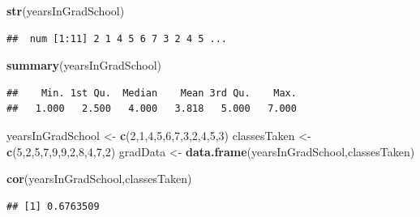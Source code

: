 \documentclass[]{book}
\newenvironment{Shaded}{\begin{snugshade}}{\end{snugshade}}
\newcommand{\KeywordTok}[1]{\textcolor[rgb]{0.13,0.29,0.53}{\textbf{#1}}}
\newcommand{\DecValTok}[1]{\textcolor[rgb]{0.00,0.00,0.81}{#1}}
\newcommand{\StringTok}[1]{\textcolor[rgb]{0.31,0.60,0.02}{#1}}
\newcommand{\NormalTok}[1]{#1}
\theoremstyle{definition}
\theoremstyle{definition}
\theoremstyle{definition}
\theoremstyle{remark}
\begin{document}
\begin{Shaded}
\begin{Highlighting}[]
\KeywordTok{str}\NormalTok{(yearsInGradSchool)}
\end{Highlighting}
\end{Shaded}

\begin{verbatim}
##  num [1:11] 2 1 4 5 6 7 3 2 4 5 ...
\end{verbatim}

\begin{Shaded}
\begin{Highlighting}[]
\KeywordTok{summary}\NormalTok{(yearsInGradSchool)}
\end{Highlighting}
\end{Shaded}

\begin{verbatim}
##    Min. 1st Qu.  Median    Mean 3rd Qu.    Max. 
##   1.000   2.500   4.000   3.818   5.000   7.000
\end{verbatim}

\begin{Shaded}
\begin{Highlighting}[]
\NormalTok{yearsInGradSchool <-}\StringTok{ }\KeywordTok{c}\NormalTok{(}\DecValTok{2}\NormalTok{,}\DecValTok{1}\NormalTok{,}\DecValTok{4}\NormalTok{,}\DecValTok{5}\NormalTok{,}\DecValTok{6}\NormalTok{,}\DecValTok{7}\NormalTok{,}\DecValTok{3}\NormalTok{,}\DecValTok{2}\NormalTok{,}\DecValTok{4}\NormalTok{,}\DecValTok{5}\NormalTok{,}\DecValTok{3}\NormalTok{)}
\NormalTok{classesTaken <-}\StringTok{ }\KeywordTok{c}\NormalTok{(}\DecValTok{5}\NormalTok{,}\DecValTok{2}\NormalTok{,}\DecValTok{5}\NormalTok{,}\DecValTok{7}\NormalTok{,}\DecValTok{9}\NormalTok{,}\DecValTok{9}\NormalTok{,}\DecValTok{2}\NormalTok{,}\DecValTok{8}\NormalTok{,}\DecValTok{4}\NormalTok{,}\DecValTok{7}\NormalTok{,}\DecValTok{2}\NormalTok{)}
\NormalTok{gradData <-}\StringTok{ }\KeywordTok{data.frame}\NormalTok{(yearsInGradSchool,classesTaken)}
\end{Highlighting}
\end{Shaded}

\begin{Shaded}
\begin{Highlighting}[]
\KeywordTok{cor}\NormalTok{(yearsInGradSchool,classesTaken)}
\end{Highlighting}
\end{Shaded}

\begin{verbatim}
## [1] 0.6763509
\end{verbatim}
\end{document}
